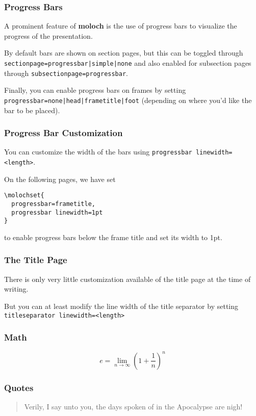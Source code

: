 \documentclass[10pt]{beamer}
\newcommand{\themename}{\textbf{moloch}\xspace}
\begin{document}
\begin{frame}[c]
  \frametitle{Progress Bars}

  A prominent feature of \themename is the use of progress bars to
  visualize the progress of the presentation. \medskip

  By default bars are shown on section pages, but this can be toggled
  through \texttt{sectionpage=progressbar|simple|none} and also enabled for
  subsection pages through \texttt{subsectionpage=progressbar}.\medskip

  Finally, you can enable progress bars on frames by setting
  \texttt{progressbar=none|head|frametitle|foot} (depending on where
  you'd like the bar to be placed).\medskip
\end{frame}

\begin{frame}[c,fragile]
  \frametitle{Progress Bar Customization}
  You can customize the width of the bars using
  \texttt{progressbar linewidth=<length>}.\medskip

  On the following pages, we have set
  \begin{verbatim}\molochset{
  progressbar=frametitle,
  progressbar linewidth=1pt
}
\end{verbatim}
  to enable progress bars below the frame title and set its width to 1pt.
\end{frame}


\begin{frame}[c,fragile]
  \frametitle{The Title Page}

  There is only very little customization available of the title page at the
  time of writing.\medskip

  But you can at least modify the line width of the title separator
  by setting \texttt{titleseparator linewidth=<length>}
\end{frame}

\begin{frame}
  \frametitle{Math}
  \begin{equation*}
    e = \lim_{n\to \infty} \left(1 + \frac{1}{n}\right)^n
  \end{equation*}
\end{frame}

\begin{frame}
  \frametitle{Quotes}
  \begin{quote}
    Verily, I say unto you, the days spoken of in the Apocalypse are nigh!
  \end{quote}
\end{frame}
\end{document}

